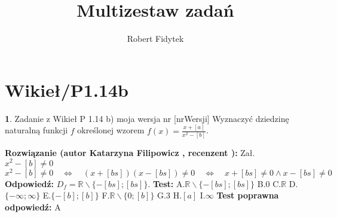 \documentclass[12pt, a4paper]{article}
\title{Multizestaw zadań}
\author{Robert Fidytek}
\date{}
\theoremstyle{definition} %
\newtheorem{zad}{}
\newcommand{\kategoria}[1]{\section{#1}} %
\newcommand{\zadStart}[1]{\begin{zad}#1\newline} %
\newcommand{\zadStop}{\end{zad}}   %
\newcommand{\rozwStart}[2]{\noindent \textbf{Rozwiązanie (autor #1 , recenzent #2): }\newline} %
\newcommand{\rozwStop}{\newline}                                            %
\newcommand{\odpStart}{\noindent \textbf{Odpowiedź:}\newline}    %
\newcommand{\odpStop}{\newline}                                             %
\newcommand{\testStart}{\noindent \textbf{Test:}\newline} %
\newcommand{\testStop}{\newline} %
\newcommand{\kluczStart}{\noindent \textbf{Test poprawna odpowiedź:}\newline} %
\newcommand{\kluczStop}{\newline} %
\begin{document}
\maketitle


\kategoria{Wikieł/P1.14b}
\zadStart{Zadanie z Wikieł P 1.14 b) moja wersja nr [nrWersji]}
Wyznaczyć dziedzinę naturalną funkcji $f$ określonej wzorem $f(x)=\frac{x+[a]}{x^2-[b]}$.
\zadStop
\rozwStart{Katarzyna Filipowicz}{}
Zał. $x^2-[b] \neq 0$
$$
x^2-[b]\neq 0 \quad \Leftrightarrow \quad (x+[bs])(x-[bs])\neq 0  \quad \Leftrightarrow \quad x+ [bs] \neq 0 \wedge x-[bs] \neq 0
$$
\rozwStop
\odpStart
$D_{f}=\mathbb{R}\backslash \{-[bs];[bs]\}$.
\odpStop
\testStart
A.$\mathbb{R}\backslash \{-[bs];[bs]\}$
B.$0$
C.$\mathbb{R}$
D.$ \{-\infty;\infty\}$
E.$\{-[b];[b]\}$
F.$\mathbb{R}\backslash \{0;[b]\}$
G.$3$
H.$[a]$
I.$\infty$
\testStop
\kluczStart
A
\kluczStop
\end{document}
